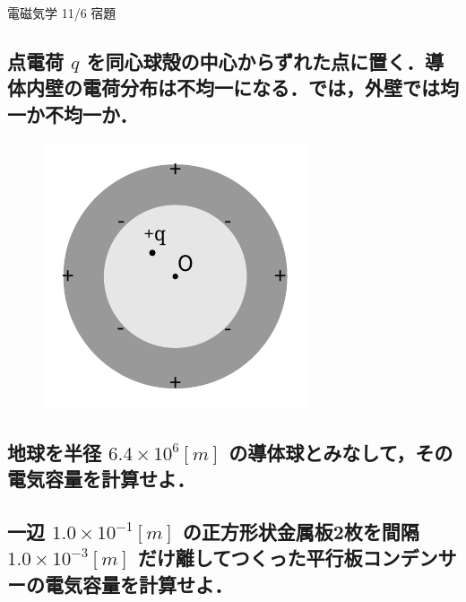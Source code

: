 \documentclass[a4paper, 12pt]{bxjsarticle}
\begin{document}
\begin{samepage}
\begin{center}
    \begin{LARGE}
        {\huge 電磁気学 11/6 宿題} 
    \end{LARGE}
\end{center}

\vspace{-1em}
\subsection{点電荷 \(q\) を同心球殻の中心からずれた点に置く．導体内壁の電荷分布は不均一になる．では，外壁では均一か不均一か．}
\vspace{-1.5em}
\begin{figure}[h]
	\includegraphics[scale=0.7]{drawing.pdf}
\end{figure}

\vspace{10em}

\subsection{地球を半径 \(6.4\times10^{6}\si{[m]}\) の導体球とみなして，その電気容量を計算せよ．}

\vspace{10em}
\end{samepage}
\newpage

\subsection{一辺 \(1.0\times10^{-1}\si{[m]}\) の正方形状金属板2枚を間隔 \(1.0\times10^{-3}\si{[m]}\) だけ離してつくった平行板コンデンサーの電気容量を計算せよ．}
\vspace{23em}
\end{document}
